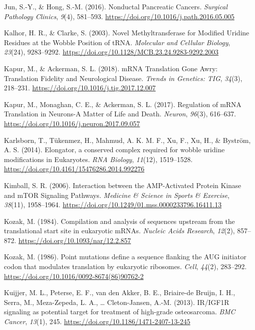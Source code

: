 \documentclass[12pt,openany]{book}
\begin{document}
\hypertarget{ref-Jun2016}{}
Jun, S.-Y., \& Hong, S.-M. (2016). Nonductal Pancreatic Cancers.
\emph{Surgical Pathology Clinics}, \emph{9}(4), 581--593.
\url{https://doi.org/10.1016/j.path.2016.05.005}

\hypertarget{ref-Kalhor2003}{}
Kalhor, H. R., \& Clarke, S. (2003). Novel Methyltransferase for
Modified Uridine Residues at the Wobble Position of tRNA.
\emph{Molecular and Cellular Biology}, \emph{23}(24), 9283--9292.
\url{https://doi.org/10.1128/MCB.23.24.9283-9292.2003}

\hypertarget{ref-Kapur2018}{}
Kapur, M., \& Ackerman, S. L. (2018). mRNA Translation Gone Awry:
Translation Fidelity and Neurological Disease. \emph{Trends in Genetics:
TIG}, \emph{34}(3), 218--231.
\url{https://doi.org/10.1016/j.tig.2017.12.007}

\hypertarget{ref-Kapur2017}{}
Kapur, M., Monaghan, C. E., \& Ackerman, S. L. (2017). Regulation of
mRNA Translation in Neurons-A Matter of Life and Death. \emph{Neuron},
\emph{96}(3), 616--637.
\url{https://doi.org/10.1016/j.neuron.2017.09.057}

\hypertarget{ref-Karlsborn2014}{}
Karlsborn, T., Tükenmez, H., Mahmud, A. K. M. F., Xu, F., Xu, H., \&
Byström, A. S. (2014). Elongator, a conserved complex required for
wobble uridine modifications in Eukaryotes. \emph{RNA Biology},
\emph{11}(12), 1519--1528.
\url{https://doi.org/10.4161/15476286.2014.992276}

\hypertarget{ref-Kimball2006}{}
Kimball, S. R. (2006). Interaction between the AMP-Activated Protein
Kinase and mTOR Signaling Pathways. \emph{Medicine \& Science in Sports
\& Exercise}, \emph{38}(11), 1958--1964.
\url{https://doi.org/10.1249/01.mss.0000233796.16411.13}

\hypertarget{ref-Kozak1984}{}
Kozak, M. (1984). Compilation and analysis of sequences upstream from
the translational start site in eukaryotic mRNAs. \emph{Nucleic Acids
Research}, \emph{12}(2), 857--872.
\url{https://doi.org/10.1093/nar/12.2.857}

\hypertarget{ref-Kozak1986}{}
Kozak, M. (1986). Point mutations define a sequence flanking the AUG
initiator codon that modulates translation by eukaryotic ribosomes.
\emph{Cell}, \emph{44}(2), 283--292.
\url{https://doi.org/10.1016/0092-8674(86)90762-2}

\hypertarget{ref-Kuijjer2013}{}
Kuijjer, M. L., Peterse, E. F., van den Akker, B. E., Briaire-de Bruijn,
I. H., Serra, M., Meza-Zepeda, L. A., \ldots{} Cleton-Jansen, A.-M.
(2013). IR/IGF1R signaling as potential target for treatment of
high-grade osteosarcoma. \emph{BMC Cancer}, \emph{13}(1), 245.
\url{https://doi.org/10.1186/1471-2407-13-245}
\end{document}
